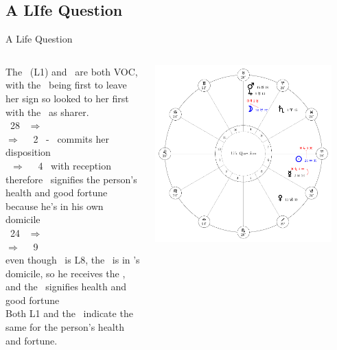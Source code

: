 \subsection{A LIfe Question}
\begin{frame}[t]{A Life Question}
\begin{columns}[T, onlytextwidth]
The \Sun\ (L1) and \Moon\ are both VOC, with the \Moon\ being first to leave her sign so looked to her first with the \Sun\ as sharer.\\
\vspace{0.25cm}
\Moon\ 28 \Aries\ $\Rightarrow$ \Taurus \\
\hspace{1em}$\Rightarrow$ \Square\ \Mercury\ 2 \Taurus\ - \Moon\ commits her disposition \\
\hspace{1em}\Mercury\ $\Rightarrow$ \Sextile\ \Saturn\ 4 \Aquarius\ with reception \\
therefore \Saturn\ signifies the person's health and good fortune because he's in his own domicile \\
\vspace{0.25cm}
\Sun\ 24 \Aquarius\ $\Rightarrow$ \Pisces \\
\hspace{1em}$\Rightarrow$ \Sextile\ \Jupiter\ 9 \Pisces \\
even though \Jupiter\ is L8, the \Sextile\ is in \Jupiter's domicile, so he receives the \Sun, and the \Sun\ signifies health and good fortune \\
\vspace{0.25cm}
Both L1 and the \Moon\ indicate the same for the person's health and fortune.
\begin{center}
{\includegraphics[width=0.9\textwidth]{charts/22-chart-life}}
\end{center}
\end{columns}
\end{frame}
